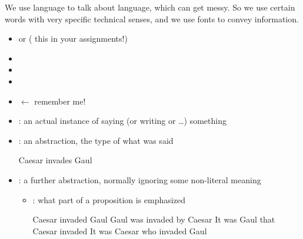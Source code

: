 \documentclass[headrule,footrule]{foils}
\begin{document}

We use language to talk about language, which can get messy.  So we
use certain words with very specific technical senses, and we use
fonts to convey information.

\begin{itemize}
\item {} or  
  \hfill (\textbf{} this in your assignments!)
\item {}
\item {}
\item {}
\item {} $\leftarrow$ remember me!
\end{itemize}


\begin{itemize}
\item {}: an actual instance of saying (or writing  or \ldots) something
\item {}: an abstraction, the type of what was said
  \begin{exe}
    \ex Caesar invades Gaul
  \end{exe}
\item {}: a further abstraction, normally ignoring some non-literal meaning
  \begin{exe}
    \ex {}
  \end{exe}
  \begin{itemize}
  \item {}: what part of a proposition is emphasized
 \begin{exe}
   \ex Caesar invaded Gaul
   \ex Gaul was invaded by Caesar
   \ex It was Gaul that  Caesar invaded
   \ex It was Caesar who invaded Gaul
  \end{exe}
  \end{itemize}

\end{itemize}
\end{document}
